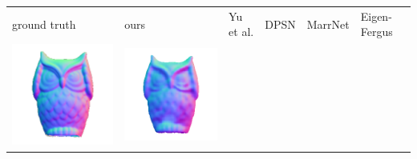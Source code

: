 \begin{tabularx}{\linewidth}{@{}Y@{}Y@{}Y@{}Y@{}Y@{}Y@{}}
ground truth & ours & Yu et al. & DPSN & MarrNet & Eigen-Fergus \\
\includegraphics[width=\linewidth]{semisynthetic/20160617_15_gt.png} &
\includegraphics[width=\linewidth]{semisynthetic/20160617_15_ours_out.png} &

\end{tabularx}
